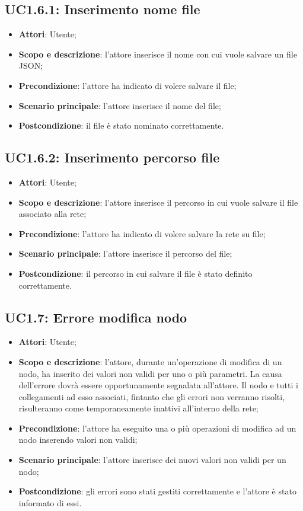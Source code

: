 \subsection{UC1.6.1: Inserimento nome file} 
\hypertarget{UC1.6.1}{} 
\begin{itemize} 
	\item{\textbf{Attori}: Utente;} 
	\item{\textbf{Scopo e descrizione}: l'attore inserisce il nome con cui vuole salvare un file JSON;} 
	\item{\textbf{Precondizione}: l'attore ha indicato di volere salvare il file;} 
	\item{\textbf{Scenario principale}: l'attore inserisce il nome del file;}
	\item{\textbf{Postcondizione}: il file è stato nominato correttamente.} 
\end{itemize} 
\subsection{UC1.6.2: Inserimento percorso file} 
\hypertarget{UC1.6.2}{} 
\begin{itemize} 
	\item{\textbf{Attori}: Utente;} 
	\item{\textbf{Scopo e descrizione}: l'attore inserisce il percorso in cui vuole salvare il file associato alla rete;} 
	\item{\textbf{Precondizione}: l'attore ha indicato di volere salvare la rete su file;} 
	\item{\textbf{Scenario principale}: l'attore inserisce il percorso del file;}
	\item{\textbf{Postcondizione}: il percorso in cui salvare il file è stato definito correttamente.}
\end{itemize}
\subsection{UC1.7: Errore modifica nodo}
\hypertarget{UC1.7}{}
\begin{itemize} 
	\item{\textbf{Attori}: Utente;} 
	\item{\textbf{Scopo e descrizione}: l'attore, durante un'operazione di modifica di un nodo, ha inserito dei valori non validi per uno o più parametri. La causa dell'errore dovrà essere opportunamente segnalata all'attore. Il nodo e tutti i collegamenti ad esso associati, fintanto che gli errori non verranno risolti, risulteranno come temporaneamente inattivi all'interno della rete;} 
	\item{\textbf{Precondizione}: l'attore ha eseguito una o più operazioni di modifica ad un nodo inserendo valori non validi;} 
	\item{\textbf{Scenario principale}: l'attore inserisce dei nuovi valori non validi per un nodo;}
	\item{\textbf{Postcondizione}: gli errori sono stati gestiti correttamente e l'attore è stato informato di essi.} 
\end{itemize}    

